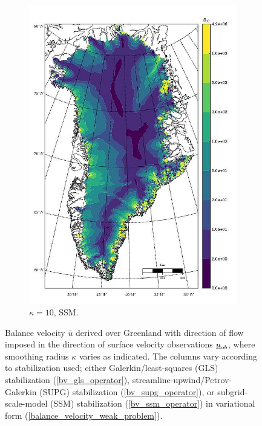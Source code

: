 \begin{figure}
\begin{subfigure}[b]{0.25\linewidth}
    \includegraphics[width=\linewidth]{images/balance_velocity/greenland/d_U_ob/Ubar_5H_kappa_10_SSM.jpg}
  \caption{$\kappa = 10$, SSM.}
  \label{greenland_bv_image_d_U_ob_kappa_10_SSM}
  \end{subfigure}
 
  \caption[Greenland balance-velocity with $\mathbf{d}^{\text{data}} = \mathbf{u}_{ob}$.]{Balance velocity $\bar{u}$ derived over Greenland with direction of flow imposed in the direction of surface velocity observations $\underline{u}_{ob}$, where smoothing radius $\kappa$ varies as indicated.  The columns vary according to stabilization used; either Galerkin/least-squares (GLS) stabilization (\ref{bv_gls_operator}), streamline-upwind/Petrov-Galerkin (SUPG) stabilization (\ref{bv_supg_operator}), or subgrid-scale-model (SSM) stabilization (\ref{bv_ssm_operator}) in variational form (\ref{balance_velocity_weak_problem}). \newline}

  \label{greenland_bv_image_d_U_ob}

\end{figure}

